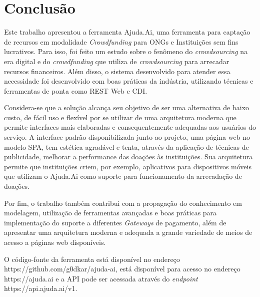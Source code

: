 \chapter{Conclusão}

Este trabalho apresentou a ferramenta Ajuda.Ai, uma ferramenta para captação de recursos em modalidade \emph{Crowdfunding} para ONGs e Instituições sem fins lucrativos. Para isso, foi feito um estudo sobre o fenômeno do \emph{crowdsourcing} na era digital e do \emph{crowdfunding} que utiliza de \emph{crowdsourcing} para arrecadar recursos financeiros. Além disso, o sistema desenvolvido para atender essa necessidade foi desenvolvido com boas práticas da indústria, utilizando técnicas e ferramentas de ponta como REST Web e CDI.

Considera-se que a solução alcança seu objetivo de ser uma alternativa de baixo custo, de fácil uso e flexível por se utilizar de uma arquitetura moderna que permite interfaces mais elaboradas e consequentemente adequadas aos usuários do serviço. A interface padrão disponibilizada junto ao projeto, uma página web no modelo SPA, tem estética agradável e tenta, através da aplicação de técnicas de publicidade, melhorar a performance das doações às instituições. Sua arquitetura permite que instituições criem, por exemplo, aplicativos para dispositivos móveis que utilizam o Ajuda.Ai como suporte para funcionamento da arrecadação de doações.

Por fim, o trabalho também contribui com a propagação do conhecimento em modelagem, utilização de ferramentas avançadas e boas práticas para implementação do suporte a diferentes \emph{Gateways} de pagamento, além de apresentar uma arquitetura moderna e adequada a grande variedade de meios de acesso a páginas web disponíveis.

O código-fonte da ferramenta está disponível no endereço https://github.com/g0dkar/ajuda-ai, está disponível para acesso no endereço https://ajuda.ai e a API pode ser acessada através do \emph{endpoint} https://api.ajuda.ai/v1.